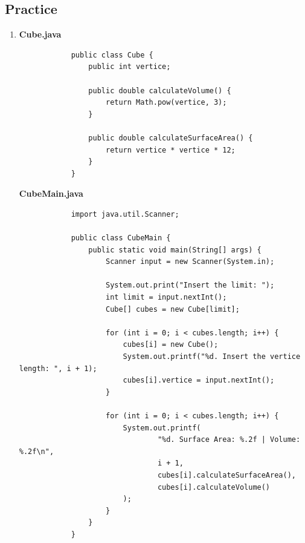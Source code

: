 \documentclass[12pt,titlepage]{article}
\begin{document}
\subsection{Practice}
\begin{enumerate}
    \item {
        \textbf{Cube.java}
        \begin{verbatim}
            public class Cube {
                public int vertice;

                public double calculateVolume() {
                    return Math.pow(vertice, 3);
                }

                public double calculateSurfaceArea() {
                    return vertice * vertice * 12;
                }
            }
        \end{verbatim}

        \newpage

        \textbf{CubeMain.java}
        \begin{verbatim}
            import java.util.Scanner;

            public class CubeMain {
                public static void main(String[] args) {
                    Scanner input = new Scanner(System.in);

                    System.out.print("Insert the limit: ");
                    int limit = input.nextInt();
                    Cube[] cubes = new Cube[limit];

                    for (int i = 0; i < cubes.length; i++) {
                        cubes[i] = new Cube();
                        System.out.printf("%d. Insert the vertice length: ", i + 1);
                        cubes[i].vertice = input.nextInt();
                    }

                    for (int i = 0; i < cubes.length; i++) {
                        System.out.printf(
                                "%d. Surface Area: %.2f | Volume: %.2f\n",
                                i + 1,
                                cubes[i].calculateSurfaceArea(),
                                cubes[i].calculateVolume()
                        );
                    }
                }
            }
        \end{verbatim}

}
\end{enumerate}
\end{document}

